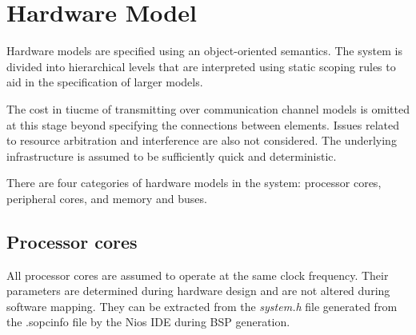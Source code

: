 \documentclass[table,11pt]{article}
\begin{document}
\section{Hardware Model}
Hardware models are specified using an object-oriented semantics. The system is divided into hierarchical levels that are interpreted using static scoping rules to aid in the specification of larger models. 

The cost in tiucme of transmitting over communication channel models is omitted at this stage beyond specifying the connections between elements. Issues related to resource arbitration and interference are also not considered. The underlying infrastructure is assumed to be sufficiently quick and deterministic.

There are four categories of hardware models in the system: processor cores, peripheral cores, and memory and buses.

\subsection{Processor cores}
All processor cores are assumed to operate at the same clock frequency. Their parameters are determined during hardware design and are not altered during software mapping. They can be extracted from the \emph{system.h} file generated from the {.sopcinfo} file by the Nios IDE during BSP generation.
\end{document}

